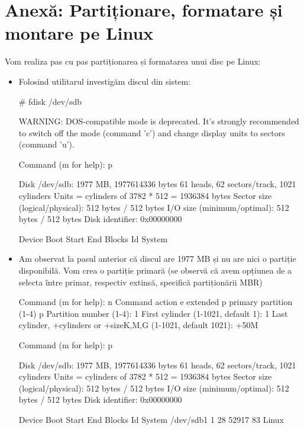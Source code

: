 \section{Anexă: Partiționare, formatare și montare pe Linux}
\label{sec:storage-partitionare}

Vom realiza pas cu pas partiționarea și formatarea unui disc pe Linux:

\begin{itemize}
	\item Folosind utilitarul  investigăm discul 
		din sistem:

\begin{screen}
# fdisk /dev/sdb


WARNING: DOS-compatible mode is deprecated. It's strongly recommended to
         switch off the mode (command 'c') and change display units to
         sectors (command 'u').


Command (m for help): p


Disk /dev/sdb: 1977 MB, 1977614336 bytes
61 heads, 62 sectors/track, 1021 cylinders
Units = cylinders of 3782 * 512 = 1936384 bytes
Sector size (logical/physical): 512 bytes / 512 bytes
I/O size (minimum/optimal): 512 bytes / 512 bytes
Disk identifier: 0x00000000


   Device Boot      Start         End      Blocks   Id  System
\end{screen}

	\item Am observat la pasul anterior că discul are 1977 MB și nu are nici
		o partiție disponibilă. Vom crea o partiție primară (se observă
		că avem opțiunea de a selecta între primar, respectiv extinsă,
		specifică partiționării MBR)

\begin{screen}
Command (m for help): n
Command action
   e   extended
   p   primary partition (1-4)
p
Partition number (1-4): 1
First cylinder (1-1021, default 1): 1
Last cylinder, +cylinders or +size{K,M,G} (1-1021, default 1021): +50M


Command (m for help): p


Disk /dev/sdb: 1977 MB, 1977614336 bytes
61 heads, 62 sectors/track, 1021 cylinders
Units = cylinders of 3782 * 512 = 1936384 bytes
Sector size (logical/physical): 512 bytes / 512 bytes
I/O size (minimum/optimal): 512 bytes / 512 bytes
Disk identifier: 0x00000000


   Device Boot      Start         End      Blocks   Id  System
/dev/sdb1               1          28       52917   83  Linux
\end{screen}


\end{itemize}

